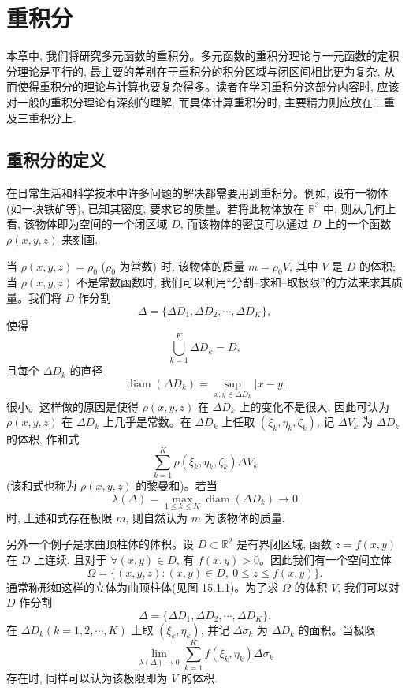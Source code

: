 \setcounter{chapter}{14} %
\chapter{重积分}
\label{chap:ma-15}

本章中, 我们将研究多元函数的重积分。多元函数的重积分理论与一元函数的定积分理论是平行的, 最主要的差别在于重积分的积分区域与闭区间相比更为复杂, 从而使得重积分的理论与计算也要复杂得多。读者在学习重积分这部分内容时, 应该对一般的重积分理论有深刻的理解, 而具体计算重积分时, 主要精力则应放在二重及三重积分上.

\section{重积分的定义}
\label{sec:ma-15-1}

在日常生活和科学技术中许多问题的解决都需要用到重积分。例如, 设有一物体 (如一块铁矿等), 已知其密度, 要求它的质量。若将此物体放在 $\mathbb R^3$ 中, 则从几何上看, 该物体即为空间的一个闭区域 $D$, 而该物体的密度可以通过 $D$ 上的一个函数 $\rho(x,y,z)$ 来刻画.

当 $\rho(x,y,z)=\rho_0$ ($\rho_0$ 为常数) 时, 该物体的质量 $m=\rho_0V$, 其中 $V$ 是 $D$ 的体积; 当 $\rho(x,y,z)$ 不是常数函数时, 我们可以利用“分割--求和--取极限”的方法来求其质量。我们将 $D$ 作分割
\[
  \Delta=\{\Delta D_1,\Delta D_2,\cdots,\Delta D_K\},
\]
使得
\[
  \bigcup_{k=1}^K\Delta D_k=D,
\]
且每个 $\Delta D_k$ 的直径
\[
  \operatorname{diam}(\Delta D_k)=\sup_{x,y\in\Delta D_k}|x-y|
\]
很小。这样做的原因是使得 $\rho(x,y,z)$ 在 $\Delta D_k$ 上的变化不是很大, 因此可认为 $\rho(x,y,z)$ 在 $\Delta D_k$ 上几乎是常数。在 $\Delta D_k$ 上任取 $(\xi_k,\eta_k,\zeta_k)$, 记 $\Delta V_k$ 为 $\Delta D_k$ 的体积, 作和式
\[
  \sum_{k=1}^K\rho(\xi_k,\eta_k,\zeta_k)\Delta V_k
\]
(该和式也称为 $\rho(x,y,z)$ 的黎曼和)。若当
\[
  \lambda(\Delta)=\max_{1\leqslant k\leqslant K}\operatorname{diam}(\Delta D_k)\to0
\]
时, 上述和式存在极限 $m$, 则自然认为 $m$ 为该物体的质量.

另外一个例子是求曲顶柱体的体积。设 $D\subset\mathbb R^2$ 是有界闭区域, 函数 $z=f(x,y)$ 在 $D$ 上连续, 且对于 $\forall(x,y)\in D$, 有 $f(x,y)>0$。因此我们有一个空间立体
\[
  \Omega=\{(x,y,z):(x,y)\in D,\ 0\leqslant z\leqslant f(x,y)\}.
\]
通常称形如这样的立体为曲顶柱体(见图 15.1.1)。为了求 $\Omega$ 的体积 $V$, 我们可以对 $D$ 作分割
\[
  \Delta=\{\Delta D_1,\Delta D_2,\cdots,\Delta D_K\}.
\]
在 $\Delta D_k(k=1,2,\cdots,K)$ 上取 $(\xi_k,\eta_k)$, 并记 $\Delta\sigma_k$ 为 $\Delta D_k$ 的面积。当极限
\[
  \lim_{\lambda(\Delta)\to0}\sum_{k=1}^K f(\xi_k,\eta_k)\Delta\sigma_k
\]
存在时, 同样可以认为该极限即为 $V$ 的体积.

